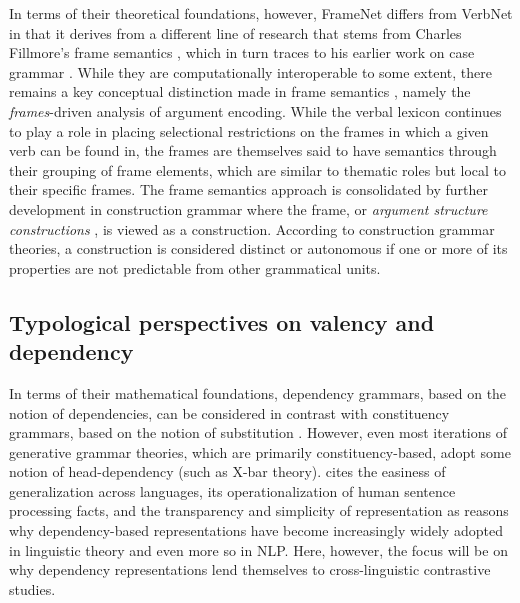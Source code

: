 In terms of their theoretical foundations, however, FrameNet differs from VerbNet in that it derives from a different line of research that stems from Charles Fillmore's frame semantics \citep{fillmore1977, fillmore1977a, fillmore1982}, which in turn traces to his earlier work on case grammar \citep{fillmore1968,fillmore1970}. While they are computationally interoperable to some extent, there remains a key conceptual distinction made in frame semantics \citet{fillmore1968}, namely the \textit{frames}-driven analysis of argument encoding. While the verbal lexicon continues to play a role in placing selectional restrictions on the frames in which a given verb can be found in, the frames are themselves said to have semantics through their grouping of frame elements, which are similar to thematic roles but local to their specific frames. The frame semantics approach is consolidated by further development in construction grammar where the frame, or \textit{argument structure constructions} \citep{goldberg1992,goldberg1995}, is viewed as a construction. According to construction grammar theories, a construction is considered distinct or autonomous if one or more of its properties are not predictable from other grammatical units. 


\subsection{Typological perspectives on valency and dependency}\label{subsec:typology}

In terms of their mathematical foundations, dependency grammars, based on the notion of dependencies, can be considered in contrast with constituency grammars, based on the notion of substitution \citep{stabler2019}. However, even most iterations of generative grammar theories, which are primarily constituency-based, adopt some notion of head-dependency (such as X-bar theory). \citet{demarneffe2019} cites the easiness of generalization across languages, its operationalization of human sentence processing facts, and the transparency and simplicity of representation as reasons why dependency-based representations have become increasingly widely adopted in linguistic theory and even more so in NLP. Here, however, the focus will be on why dependency representations lend themselves to cross-linguistic contrastive studies. 


